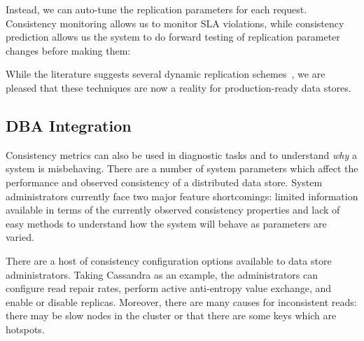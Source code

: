 Instead, we can auto-tune the replication parameters for each
request. Consistency monitoring allows us to monitor SLA violations,
while consistency prediction allows us the system to do forward testing of
replication parameter changes before making them:


While the literature suggests several dynamic replication
schemes~\cite{vahdat-article}, we are pleased that these
techniques are now a reality for production-ready data stores.

\subsection{DBA Integration}
\label{sec:dba}

Consistency metrics can also be used in diagnostic tasks and to
understand \textit{why} a system is misbehaving. There are a number of
system parameters which affect the performance and observed
consistency of a distributed data store. System administrators
currently face two major feature shortcomings: limited
information available in terms of the currently observed consistency
properties and lack of easy methods to understand how the
system will behave as parameters are varied.


There are a host of consistency configuration options available to
data store administrators. Taking Cassandra as an example, the administrators can
configure read repair rates, perform active anti-entropy value
exchange, and enable or disable replicas. Moreover, there are many
causes for inconsistent reads: there may be slow nodes in the cluster
or that there are some keys which are hotspots.


